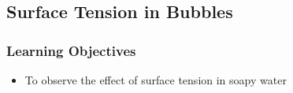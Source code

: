 

\subsection{Surface Tension in Bubbles}

\subsubsection*{Learning Objectives}
\begin{itemize}
\item{To observe the effect of surface tension in soapy water}
\end{itemize}

